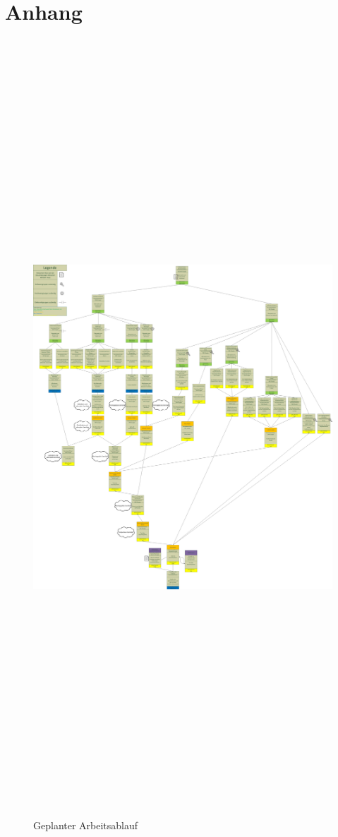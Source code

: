 \documentclass{scrartcl}
\begin{document}
\section{Anhang}
\label{kap:Anhang}
\clearpage
\setlength\pdfpagewidth{600mm}
\setlength\pdfpageheight{600mm}
\begin{figure}[p]
\includegraphics[height=500mm]{Bilder/FaTNet_arbeitsablauf}
\caption{Geplanter Arbeitsablauf}
\label{fig:arbeitsablauf}
\end{figure}

\clearpage

\setlength\pdfpagewidth{210mm}
\setlength\pdfpageheight{297mm}
\end{document}
